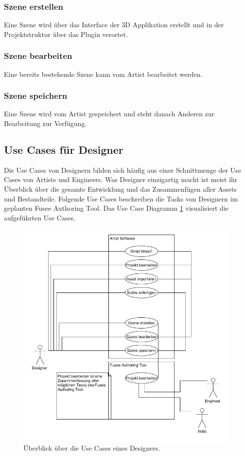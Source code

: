 \documentclass[pagesize, paper=a4, fontsize=12pt, titlepage=true, headings=small, headnosepline, abstractoff, liststotoc, nochapterprefix, plainheadsepline, twoside]{scrreprt}
\begin{document}
\subsubsection{Szene erstellen}
Eine Szene wird über das Interface der 3D Applikation erstellt und in der Projektstruktur über das Plugin verortet.

\subsubsection{Szene bearbeiten}
Eine bereits bestehende Szene kann vom Artist bearbeitet werden.

\subsubsection{Szene speichern}
Eine Szene wird vom Artist gespeichert und steht danach Anderen zur Bearbeitung zur Verfügung.

\subsection{Use Cases für Designer}
Die Use Cases von Designern bilden sich häufig aus einer Schnittmenge der Use Cases von Artists und Engineers. Was Designer einzigartig macht ist meist ihr Überblick über die gesamte Entwicklung und das Zusammenfügen aller Assets und Bestandteile. Folgende Use Cases beschreiben die Tasks von Designern im geplanten Fusee Authoring Tool. Das Use Case Diagramm \ref{UseCaseDesigner} visualisiert die aufgeführten Use Cases.

\begin{figure}[ht]
	\centering
	\includegraphics[width=\linewidth - 2cm]{Bilder/UseCase_Designer.jpg}
	\caption{Überblick über die Use Cases eines Designers.}
	\label{UseCaseDesigner}
\end{figure}
\end{document}
